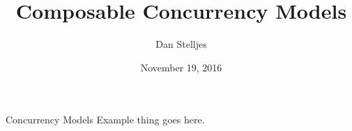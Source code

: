 \documentclass{beamer}
\title{Composable Concurrency Models}
\date{November 19, 2016}
\author{Dan Stelljes}
\institute{University of Minnesota Morris}
\begin{document}
  \maketitle

  \begin{frame}{Concurrency Models}
    Example thing goes here.
  \end{frame}
\end{document}
